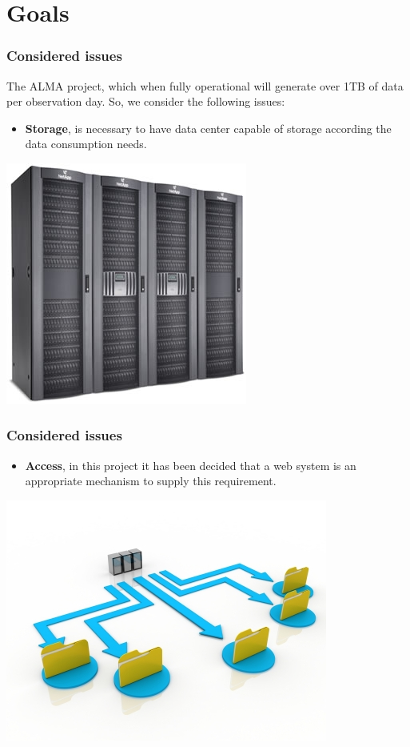 \section{Goals}

\begin{frame}
\frametitle{Considered issues}

The ALMA project, which when fully operational will generate over 1TB of data per observation day. So, we consider the
following issues:

\begin{itemize}
	\item \textbf{Storage}, is necessary to have data center capable of storage according the data consumption needs.
\end{itemize}

\begin{center}
\includegraphics[height=0.3\textheight]{img/storage}
\end{center}

\end{frame}


\begin{frame}
\frametitle{Considered issues}
\begin{itemize}
	\item \textbf{Access}, in this project it has been decided that a web system is an appropriate mechanism to supply
		this requirement.
\end{itemize}

\begin{center}
\includegraphics[height=0.3\textheight]{img/access}
\end{center}

\end{frame}


